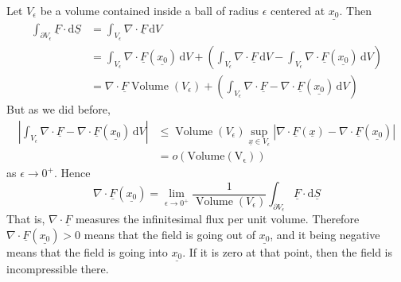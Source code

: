 \begin{example}
    Let $V_\epsilon$ be a volume contained inside a ball of radius $\epsilon$ centered at $\underline{x_0}$.
    Then
    \begin{align*}
        \int_{\partial V_\epsilon}\underline{F}\cdot\mathrm d\underline{S}&=\int_{V_\epsilon}\nabla\cdot\underline{F}\,\mathrm dV\\
        &=\int_{V_\epsilon}\nabla\cdot\underline{F}(\underline{x_0})\,\mathrm dV+\left( \int_{V_\epsilon}\nabla\cdot\underline{F}\,\mathrm dV-\int_{V_\epsilon}\nabla\cdot\underline{F}(\underline{x_0})\,\mathrm dV \right)\\
        &=\nabla\cdot\underline{F}\operatorname{Volume}(V_\epsilon)+\left( \int_{V_\epsilon}\nabla\cdot\underline{F}-\nabla\cdot\underline{F}(\underline{x_0})\,\mathrm dV \right)
    \end{align*}
    But as we did before,
    \begin{align*}
        \left| \int_{V_\epsilon}\nabla\cdot\underline{F}-\nabla\cdot\underline{F}(\underline{x_0})\,\mathrm dV \right|&\le\operatorname{Volume}(V_\epsilon)\sup_{\underline{x}\in V_\epsilon}|\nabla\cdot\underline{F}(\underline{x})-\nabla\cdot\underline{F}(\underline{x_0})|\\
        &=o(\operatorname{Volume(V_\epsilon)})
    \end{align*}
    as $\epsilon\to 0^+$.
    Hence
    $$\nabla\cdot\underline{F}(\underline{x_0})=\lim_{\epsilon\to0^+}\frac{1}{\operatorname{Volume}(V_\epsilon)}\int_{\partial V_\epsilon}\underline{F}\cdot\mathrm d\underline{S}$$
    That is, $\nabla\cdot\underline{F}$ measures the infinitesimal flux per unit volume.
    Therefore $\nabla\cdot\underline{F}(\underline{x_0})>0$ means that the field is going out of $\underline{x_0}$, and it being negative means that the field is going into $\underline{x_0}$.
    If it is zero at that point, then the field is incompressible there.
\end{example}
